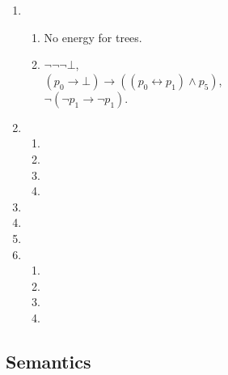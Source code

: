 \documentclass[a4paper,11pt]{article}
\begin{document}
\begin{enumerate}
\item %
\begin{enumerate}
\item %
No energy for trees.
\item %
$\neg \neg \neg \bot$,\\
$(p_{0} \rightarrow \bot) \rightarrow ((p_{0} \leftrightarrow p_{1}) \wedge p_{5})$,\\
$\neg (\neg p_{1} \rightarrow \neg p_{1})$.
\end{enumerate}

\item %
\begin{enumerate}
\item %
\item %
\item %
\item %
\end{enumerate}

\item %

\item %

\item %

\item %
\begin{enumerate}
\item %
\item %
\item %
\item %
\end{enumerate}

\end{enumerate}


\subsection{Semantics}
\end{document}
